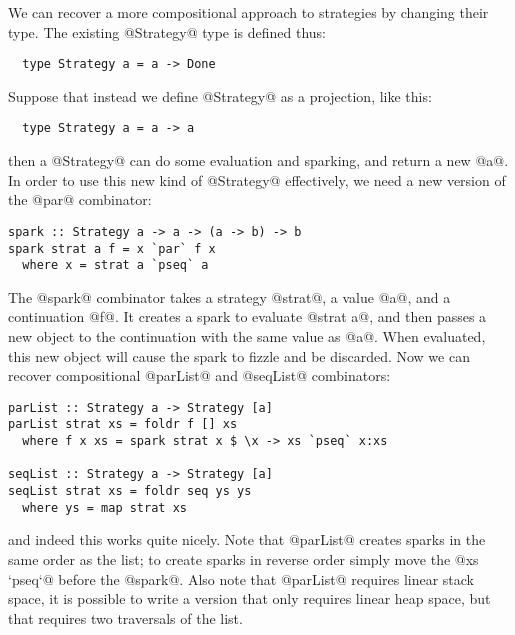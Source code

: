 \documentclass[twocolumn,9pt]{sigplanconf}
\begin{document}
We can recover a more compositional approach to strategies
by changing their type.  The existing @Strategy@ type is defined thus:
\begin{verbatim}
  type Strategy a = a -> Done
\end{verbatim}
Suppose that instead we define @Strategy@ as a projection, like this:
\begin{verbatim}
  type Strategy a = a -> a
\end{verbatim}
then a @Strategy@ can do some evaluation and sparking, and return a
new @a@.  In order to use this new kind of @Strategy@ effectively, we
need a new version of the @par@ combinator:
\begin{verbatim}
spark :: Strategy a -> a -> (a -> b) -> b
spark strat a f = x `par` f x
  where x = strat a `pseq` a
\end{verbatim}
The @spark@ combinator takes a strategy @strat@, a value @a@, and a
continuation @f@.  It creates a spark to evaluate @strat a@, and then
passes a new object to the continuation with the same value as @a@.
When evaluated, this new object will cause the spark to fizzle and be
discarded.
Now we can recover compositional @parList@ and @seqList@ combinators:
\begin{verbatim}
parList :: Strategy a -> Strategy [a]
parList strat xs = foldr f [] xs
  where f x xs = spark strat x $ \x -> xs `pseq` x:xs

seqList :: Strategy a -> Strategy [a]
seqList strat xs = foldr seq ys ys
  where ys = map strat xs
\end{verbatim}
and indeed this works quite nicely.  Note that @parList@ creates
sparks in the same order as the list; to create sparks in reverse
order simply move the @xs `pseq`@ before the @spark@.  Also note that
@parList@ requires linear stack space, it is possible to write a
version that only requires linear heap space, but that requires two
traversals of the list.
\end{document}
